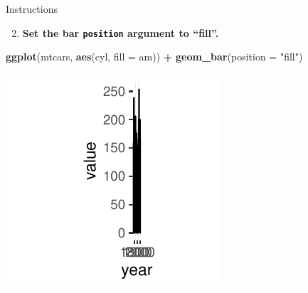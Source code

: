 \documentclass[
  ignorenonframetext,
]{beamer}
\newenvironment{Shaded}{\begin{snugshade}}{\end{snugshade}}
\newcommand{\AttributeTok}[1]{\textcolor[rgb]{0.13,0.29,0.53}{#1}}
\newcommand{\FunctionTok}[1]{\textcolor[rgb]{0.13,0.29,0.53}{\textbf{#1}}}
\newcommand{\NormalTok}[1]{#1}
\newcommand{\SpecialCharTok}[1]{\textcolor[rgb]{0.81,0.36,0.00}{\textbf{#1}}}
\newcommand{\StringTok}[1]{\textcolor[rgb]{0.31,0.60,0.02}{#1}}
\providecommand{\tightlist}{%
  \setlength{\itemsep}{0pt}\setlength{\parskip}{0pt}}
\begin{document}
\begin{frame}[fragile]{Instructions}
\label{instructions-1}
\begin{enumerate}
\setcounter{enumi}{1}
\tightlist
\item
  \textbf{Set the bar \texttt{position} argument to ``fill''.}
\end{enumerate}


\begin{Shaded}
\begin{Highlighting}[]
\FunctionTok{ggplot}\NormalTok{(mtcars, }\FunctionTok{aes}\NormalTok{(cyl, }\AttributeTok{fill =}\NormalTok{ am)) }\SpecialCharTok{+} \FunctionTok{geom\_bar}\NormalTok{(}\AttributeTok{position =} \StringTok{"fill"}\NormalTok{)}
\end{Highlighting}
\end{Shaded}

\begin{center}\includegraphics[width=0.5\linewidth]{Figs/unnamed-chunk-45-1} \end{center}
\end{frame}
\end{document}
